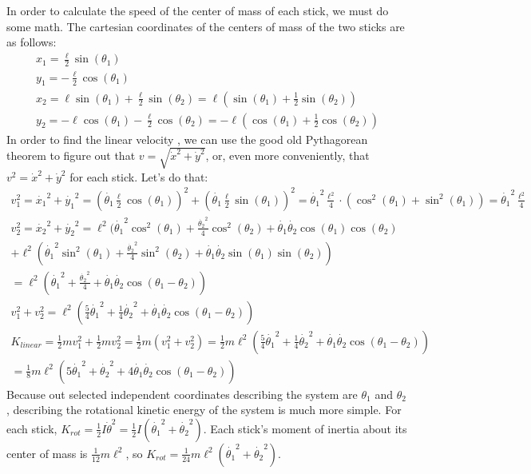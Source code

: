 \documentclass[]{article}
\begin{document}
In order to calculate the speed of the center of mass of each stick, we must do some math. The cartesian coordinates of the centers of mass of the two sticks are as follows:
\begin{gather*}
x_1 = \frac{\ell}{2}\sin(\theta_1) \\
y_1 = -\frac{\ell}{2}\cos(\theta_1) \\
x_2 = \ell \sin(\theta_1) + \frac{\ell}{2} \sin(\theta_2) = \ell (\sin(\theta_1) + \frac{1}{2}\sin(\theta_2)) \\
y_2 = -\ell \cos(\theta_1) - \frac{\ell}{2} \cos(\theta_2) = -\ell (\cos(\theta_1) + \frac{1}{2} \cos(\theta_2))
\end{gather*}
In order to find the linear velocity , we can use the good old Pythagorean theorem to figure out that $v = \sqrt{\dot{x}^2 + \dot{y}^2}$, or, even more conveniently, that $v^2 = \dot{x}^2 + \dot{y}^2$ for each stick. Let's do that:
\begin{gather*}
	v_1^2 = \dot{x_1}^2 + \dot{y_1}^2 = (\dot{\theta_1} \frac{\ell}{2}\cos(\theta_1))^2 + (\dot{\theta_1} \frac{\ell}{2}\sin(\theta_1))^2 = \dot{\theta_1}^2 \frac{\ell^2}{4} \cdot (\cos^2(\theta_1) + \sin^2(\theta_1)) = \dot{\theta_1}^2 \frac{\ell^2}{4} \\
	v_2^2 = \dot{x_2}^2 + \dot{y_2}^2 = \ell^2(\dot{\theta_1}^2 \cos^2(\theta_1) + \frac{\dot{\theta_2}^2}{4}\cos^2(\theta_2) + \dot{\theta_1}\dot{\theta_2}\cos(\theta_1)\cos(\theta_2) \\ + \ell^2(\dot{\theta_1}^2\sin^2(\theta_1) + \frac{\dot{\theta_2}^2}{4}\sin^2(\theta_2) + \dot{\theta_1}\dot{\theta_2}\sin(\theta_1)\sin(\theta_2)) \\
	= \ell^2 (\dot{\theta_1}^2 + \frac{\dot{\theta_2}^2}{4} + \dot{\theta_1}\dot{\theta_2}\cos(\theta_1 - \theta_2)) \\
	v_1^2 + v_2^2 = \ell^2(\frac{5}{4}\dot{\theta_1}^2 + \frac{1}{4}\dot{\theta_2}^2 + \dot{\theta_1}\dot{\theta_2}\cos(\theta_1 - \theta_2)) \\
	K_{linear} = \frac{1}{2}mv_1^2 + \frac{1}{2}mv_2^2 = \frac{1}{2}m(v_1^2 + v_2^2) = \frac{1}{2}m\ell^2(\frac{5}{4}\dot{\theta_1}^2 + \frac{1}{4}\dot{\theta_2}^2 + \dot{\theta_1}\dot{\theta_2}\cos(\theta_1 - \theta_2)) \\ = \frac{1}{8}m\ell^2(5\dot{\theta_1}^2 + \dot{\theta_2}^2 + 4\dot{\theta_1}\dot{\theta_2}\cos(\theta_1 - \theta_2))
\end{gather*}
Because out selected independent coordinates describing the system are $\theta_1$ and $\theta_2$, describing the rotational kinetic energy of the system is much more simple. For each stick, $K_{rot} = \frac12 I \dot{\theta}^2 = \frac12 I (\dot{\theta_1}^2 + \dot{\theta_2}^2)$. Each stick's moment of inertia about its center of mass is $\frac{1}{12} m \ell^2$, so $K_{rot} = \frac{1}{24}m\ell^2(\dot{\theta_1}^2 + \dot{\theta_2}^2)$.
\end{document}
